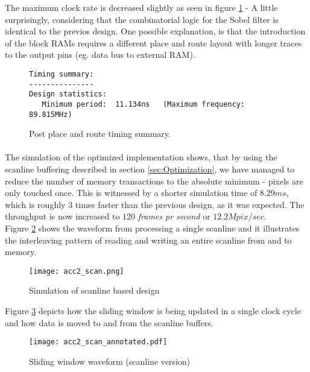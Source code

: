 The maximum clock rate is decreased slightly as seen in figure \ref{fig:sum_ScanPostPAR_report} - A little surprisingly, considering that the combinatorial logic for the Sobel filter is identical to the previos design. One possible explanation, is that the introduction of the block RAMs requires a different place and route layout with longer traces to the output pins (eg. data bus to external RAM).

\begin{figure}[H]
\centering
\small
\begin{BVerbatim}
Timing summary:
---------------
Design statistics:
   Minimum period:  11.134ns   (Maximum frequency:  89.815MHz)
\end{BVerbatim}
\caption{Post place and route timing summary.}
\label{fig:sum_ScanPostPAR_report}
\end{figure}

\paragraph*{}
The simulation of the optimized implementation shows, that by using the scanline buffering described in section \ref{sec:Optimization}, we have managed to reduce the number of memory transactions to the absolute minimum - pixels are only touched once. This is witnessed by a shorter simulation time of $8.29ms$, which is roughly 3 times faster than the previous design, as it was expected. The throughput is now increased to $120$ \textit{frames pr second} or $12.2Mpix/sec$.\\
Figure \ref{fig:acc2_scanWave} shows the waveform from processing a single scanline and it illustrates the interleaving pattern of reading and writing an entire scanline from and to memory.

\begin{figure}[H]
	\centering
    \texttt{[image: acc2\_scan.png]}
	\caption{Simulation of scanline based design}
	\label{fig:acc2_scanWave}
\end{figure}
Figure \ref{fig:acc2_scanWaveSlide} depicts how the sliding window is being updated in a single clock cycle and how data is moved to and from the scanline buffers.

\begin{figure}[H]
	\centering
    \texttt{[image: acc2\_scan\_annotated.pdf]}
	\caption{Sliding window waveform (scanline version)}
	\label{fig:acc2_scanWaveSlide}
\end{figure}

